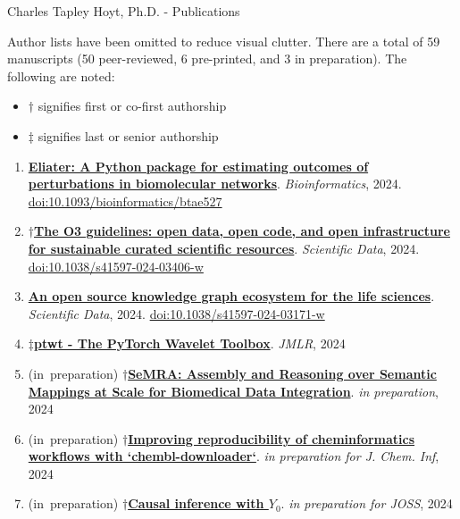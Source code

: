 \documentclass[10pt,a4paper,sans]{moderncv} %
\author{Charles Tapley Hoyt}
\newcommand{\wikidata}[2]{\href{https://bioregistry.io/wikidata:#1?provider=scholia}{{#2}}}
\begin{document}
{\Huge Charles Tapley Hoyt, Ph.D. - Publications}

\vspace{3mm}

Author lists have been omitted to reduce visual clutter.
There are a total of 59 manuscripts (50 peer-reviewed, 6 pre-printed, and 3 in preparation).
The following are noted:

\begin{itemize}
\item $\dagger$ signifies first or co-first authorship
\item $\ddagger$ signifies last or senior authorship
\end{itemize}

\vspace{0.3cm}

    \begin{enumerate}
    \setcounter{enumi}{0}
    \itemsep0.5em
        \item
        \wikidata{Q130227212}{\textbf{Eliater: A Python package for estimating outcomes of perturbations in biomolecular networks}}.
    \textit{Bioinformatics}, 2024.  {\scriptsize \href{https://bioregistry.io/doi:10.1093/BIOINFORMATICS/BTAE527}{doi:10.1093/bioinformatics/btae527}}
        \item
        $\dagger$\wikidata{Q126325456}{\textbf{The O3 guidelines: open data, open code, and open infrastructure for sustainable curated scientific resources}}.
    \textit{Scientific Data}, 2024.  {\scriptsize \href{https://bioregistry.io/doi:10.1038/S41597-024-03406-W}{doi:10.1038/s41597-024-03406-w}}
        \item
        \wikidata{Q125554573}{\textbf{An open source knowledge graph ecosystem for the life sciences}}.
    \textit{Scientific Data}, 2024.  {\scriptsize \href{https://bioregistry.io/doi:10.1038/S41597-024-03171-W}{doi:10.1038/s41597-024-03171-w}}
        \item
        $\ddagger$\wikidata{Q126325520}{\textbf{ptwt - The PyTorch Wavelet Toolbox}}.
    \textit{JMLR}, 2024
        \item
        (in~preparation) $\dagger$\wikidata{}{\textbf{SeMRA: Assembly and Reasoning over Semantic Mappings at Scale for Biomedical Data Integration}}.
    \textit{in preparation}, 2024
        \item
        (in~preparation) $\dagger$\wikidata{}{\textbf{Improving reproducibility of cheminformatics workflows with `chembl-downloader`}}.
    \textit{in preparation for J. Chem. Inf}, 2024
        \item
        (in~preparation) $\dagger$\wikidata{}{\textbf{Causal inference with $Y_0$}}.
    \textit{in preparation for JOSS}, 2024
    \end{enumerate}
\end{document}
